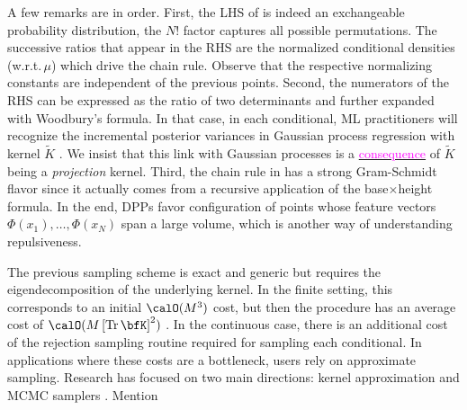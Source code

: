 \documentclass[twoside,11pt]{article}
\begin{document}
        A few remarks are in order.
        First, the LHS of  is indeed an exchangeable probability distribution, the $N!$ factor captures all possible permutations.
        The successive ratios that appear in the RHS are the normalized conditional densities (w.r.t.\,$\mu$) which drive the chain rule.
        Observe that the respective normalizing constants are independent of the previous points.
        Second, the numerators of the RHS can be expressed as the ratio of two determinants and further expanded with Woodbury's formula.
        In that case, in each conditional, ML practitioners will recognize the incremental posterior variances in Gaussian process regression with kernel $\tilde K$ \citep[Equation 2.26]{RaWi06}.
        We insist that this link with Gaussian processes is a \href{https://dppy.readthedocs.io/en/latest/finite_dpps/exact_sampling.html#caution}{\textcolor{magenta}{consequence}} of $\tilde K$ being a \emph{projection} kernel.
        Third, the chain rule in  has a strong Gram-Schmidt flavor since it actually comes from a recursive application of the base$\times$height formula.
        In the end, DPPs favor configuration of points whose feature vectors $\Phi(x_1),\dots, \Phi(x_N)$ span a large volume, which is another way of understanding repulsiveness.

        The previous sampling scheme is exact and generic but requires the eigendecomposition of the underlying kernel.
        In the finite setting, this corresponds to an initial $\calO(M^3)$ cost, but then the procedure has an average cost of $\calO(M\lrb{\Tr \bfK}^2)$
        \citep{TrBaAm18}.
        In the continuous case, there is an additional cost of the rejection sampling routine required for sampling each conditional.
        In applications where these costs are a bottleneck, users rely on approximate sampling.
        Research has focused on two main directions: kernel approximation \citep{AKFT13} and MCMC samplers \citep{AnGhRe16, LiJeSr16c, GaBaVa17}.
        Mention \citep{Pou19,DeCaVa19}
\end{document}
